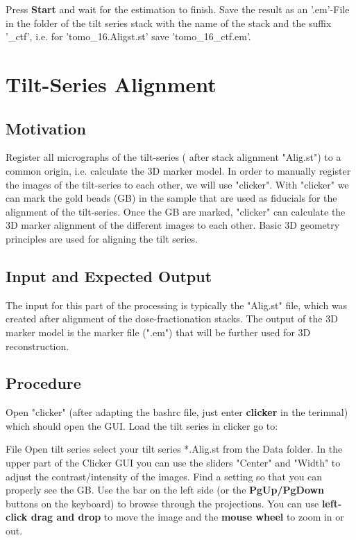 \documentclass[12pt,a4paper]{scrartcl}
\begin{document}
{Press \textbf{Start} and wait for the estimation to finish. Save the result as an ’.em’-File in the folder of the tilt series stack with the name of the stack and the suffix ’\_ctf’, i.e. for ’tomo\_16.Aligst.st’ save ’tomo\_16\_ctf.em’.

\section{Tilt-Series Alignment}
\subsection{Motivation}
Register all micrographs of the tilt-series ( after stack alignment "Alig.st") to a common origin, i.e. calculate the 3D marker model. In order to manually register the images of the tilt-series to each other, we will use "clicker". With "clicker" we can mark the gold beads (GB) in the sample that are used as fiducials for the alignment of the tilt-series. Once the GB are marked, "clicker" can calculate the 3D marker alignment of the different images to each other. Basic 3D geometry principles are used for aligning the tilt series.
\subsection{Input and Expected Output}
The input for this part of the processing is typically the "Alig.st" file, which was created after alignment of the dose-fractionation stacks. The output of the 3D marker model is the marker file (".em") that will be further used for 3D reconstruction.
\subsection{Procedure}
Open "clicker" (after adapting the bashrc file, just enter \textbf{clicker} in the terimnal) which should open the GUI. Load the tilt series in clicker go to: \par File \textrightarrow{}  Open tilt series \textrightarrow{} select your tilt series *.Alig.st from the Data folder. In the upper part of the Clicker GUI you can use the sliders "Center" and "Width" to adjust the contrast/intensity of the images. Find a setting so that you can properly see the GB. Use the bar on the left side (or the \textbf{PgUp/PgDown} buttons on the keyboard) to browse through the projections. You can use \textbf{left-click drag and drop} to move the image and the \textbf{mouse wheel} to zoom in or out.

}
\end{document}
